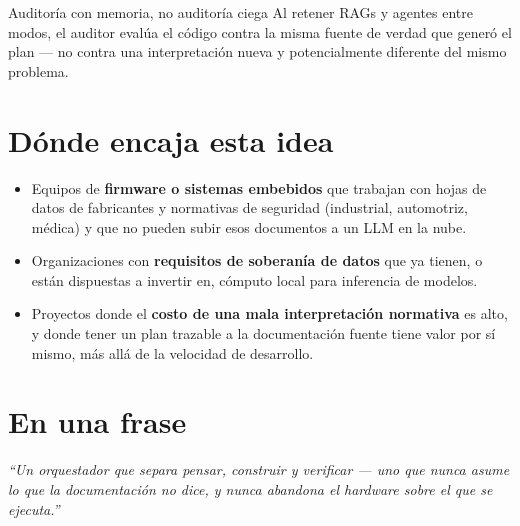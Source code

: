 \documentclass[11pt]{article}
\begin{document}
\vspace{0.4em}

\begin{ideabox}{Auditoría con memoria, no auditoría ciega}
Al retener RAGs y agentes entre modos, el auditor evalúa el código contra la misma fuente de verdad que generó el plan --- no contra una interpretación nueva y potencialmente diferente del mismo problema.
\end{ideabox}

\section{Dónde encaja esta idea}

\begin{itemize}
  \item Equipos de \textbf{firmware o sistemas embebidos} que trabajan con hojas de datos de fabricantes y normativas de seguridad (industrial, automotriz, médica) y que no pueden subir esos documentos a un LLM en la nube.
  \item Organizaciones con \textbf{requisitos de soberanía de datos} que ya tienen, o están dispuestas a invertir en, cómputo local para inferencia de modelos.
  \item Proyectos donde el \textbf{costo de una mala interpretación normativa} es alto, y donde tener un plan trazable a la documentación fuente tiene valor por sí mismo, más allá de la velocidad de desarrollo.
\end{itemize}

\section{En una frase}

\begin{center}
\begin{tcolorbox}[
  enhanced, colback=inkNavy, colframe=inkNavy,
  coltext=white, width=0.9\textwidth, halign=center,
  arc=3pt, boxrule=0pt
]
\large\itshape ``Un orquestador que separa pensar, construir y verificar --- uno que nunca asume lo que la documentación no dice, y nunca abandona el hardware sobre el que se ejecuta.''
\end{tcolorbox}
\end{center}
\end{document}
